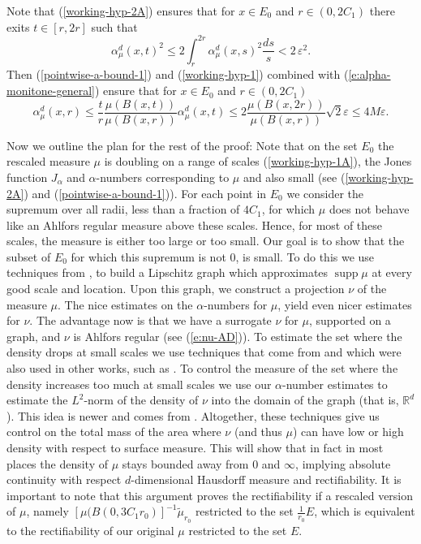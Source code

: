 \documentclass[11pt]{amsart}
\newcommand{\R}{{\mathbb R}}       %
\newcommand{\rf}[1]{{(\ref{#1})}}
\newcommand{\supp}{\operatorname{supp}}
\newcommand{\ve}{{\varepsilon}}
\newcommand{\wt}[1]{{\widetilde{#1}}}
\theoremstyle{definition}
\theoremstyle{remark}
\numberwithin{equation}{section}
\begin{document}
Note that \rf{working-hyp-2A}  ensures that for $x\in E_0$ and $r\in (0, 2C_1)$ there exits $t\in [r,2r]$ such that 
\begin{equation}\label{pointwise-a-bound-1}
\alpha_{\mu}^{d}(x,t)^{2}\le 2\int_{r}^{2r} \alpha_{\mu}^{d}(x,s)^{2}\frac{ds}{s}<2\,\ve^2.
\end{equation}
Then \rf{pointwise-a-bound-1} and \rf{working-hyp-1} combined with \rf{e:alpha-monitone-general} ensure that for $x\in E_0$ and $r\in (0, 2C_1)$ 
\begin{equation}\label{pointwise-a-bound-2}
\alpha_{\mu}^{d}(x,r)\le \frac{t}{r}\frac{\mu(B(x,t))}{\mu(B(x,r))}\alpha_{\mu}^{d}(x,t)\le 2\frac{\mu(B(x,2r))}{\mu(B(x,r))}\sqrt{2}\ve\le 4M\ve.
\end{equation}

Now we outline the plan for the rest of the proof: Note that on the set $E_0$ the rescaled measure $\mu$ is doubling on a range of scales \rf{working-hyp-1A}, the Jones function $J_\alpha$ and $\alpha$-numbers corresponding to 
$\mu$ and also small (see \rf{working-hyp-2A} and \rf{pointwise-a-bound-1}). For each point in $E_0$ we consider the supremum over all radii, less than a fraction of $4C_1$, 
for which $\mu$ does not behave like an Ahlfors regular 
measure above these scales. Hence, for most of these scales, the measure is either too large or too small. Our goal is to show that the subset of $E_0$ for which this supremum is not 0, is small.
To do this we use techniques from \cite{DT12}, to build a Lipschitz graph  which approximates $\supp\mu$ at every good scale and location. Upon this graph, we 
construct a projection $\nu$ of the measure $\mu$. The nice estimates on the $\alpha$-numbers for $\mu$, yield even nicer estimates for $\nu$. The advantage now is that we have a surrogate $\nu$ for $
\mu$, supported on a graph, and $\nu$ is Ahlfors regular (see \rf{e:nu-AD}). 
To estimate the set where the density drops at small scales we use techniques that come from \cite{Leger} and which were also used in other works, such as \cite{AT15}. To control the measure of the set where the density increases too much at small scales we use our $\alpha$-number estimates to estimate the $L^{2}$-norm of the density of $\nu$ into the domain of the graph (that is, $\R^{d}$). 
 This idea is newer and comes from \cite{Tol17}.
  Altogether, these techniques give us control on the total mass of the area where $\nu$ (and thus $\mu$) can have low or high  density with respect to surface measure. This will show that in fact in most places the density of $\mu$ stays bounded away from $0$ and $\infty$, implying absolute continuity with respect $d$-dimensional Hausdorff measure and rectifiability. It is important to note that this argument proves 
  the rectifiability if a rescaled version of $\mu$, namely $[\mu(B(0,3C_1r_0)]^{-1}\wt\mu_{r_0}$ restricted to the set $\frac{1}{r_0}E$, which is equivalent to the rectifiability of our original $\mu$ restricted to the set 
  $E$.
\end{document}
